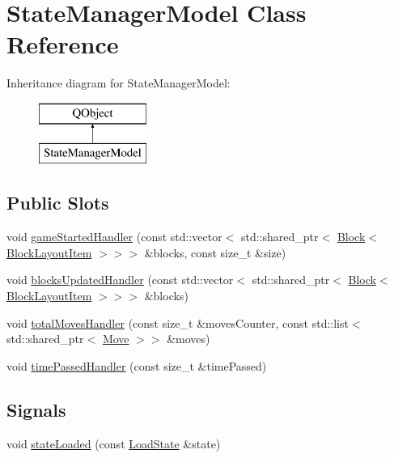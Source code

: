 \hypertarget{class_state_manager_model}{}\section{State\+Manager\+Model Class Reference}
\label{class_state_manager_model}
Inheritance diagram for State\+Manager\+Model\+:\begin{figure}[H]
\begin{center}
\leavevmode
\includegraphics[height=2.000000cm]{class_state_manager_model}
\end{center}
\end{figure}
\subsection*{Public Slots}
\begin{DoxyCompactItemize}
\item 
void \mbox{\hyperlink{class_state_manager_model_a414fe4dfa55aa139c26b3ccd002328ff}{game\+Started\+Handler}} (const std\+::vector$<$ std\+::shared\+\_\+ptr$<$ \mbox{\hyperlink{class_block}{Block}}$<$ \mbox{\hyperlink{class_block_layout_item}{Block\+Layout\+Item}} $>$$>$$>$ \&blocks, const size\+\_\+t \&size)
\item 
void \mbox{\hyperlink{class_state_manager_model_a51df218169f899e063572ca5df5a388b}{blocks\+Updated\+Handler}} (const std\+::vector$<$ std\+::shared\+\_\+ptr$<$ \mbox{\hyperlink{class_block}{Block}}$<$ \mbox{\hyperlink{class_block_layout_item}{Block\+Layout\+Item}} $>$$>$$>$ \&blocks)
\item 
void \mbox{\hyperlink{class_state_manager_model_a3cd67127d4b7edcb431db1d700f0048e}{total\+Moves\+Handler}} (const size\+\_\+t \&moves\+Counter, const std\+::list$<$ std\+::shared\+\_\+ptr$<$ \mbox{\hyperlink{struct_move}{Move}} $>$$>$ \&moves)
\item 
void \mbox{\hyperlink{class_state_manager_model_ab3f4c9b1d44a75c63c034e79f88ee9f0}{time\+Passed\+Handler}} (const size\+\_\+t \&time\+Passed)
\end{DoxyCompactItemize}
\subsection*{Signals}
\begin{DoxyCompactItemize}
\item 
void \mbox{\hyperlink{class_state_manager_model_ade47748f618f84b0a2a32be1da177ad5}{state\+Loaded}} (const \mbox{\hyperlink{struct_load_state}{Load\+State}} \&state)
\end{DoxyCompactItemize}
